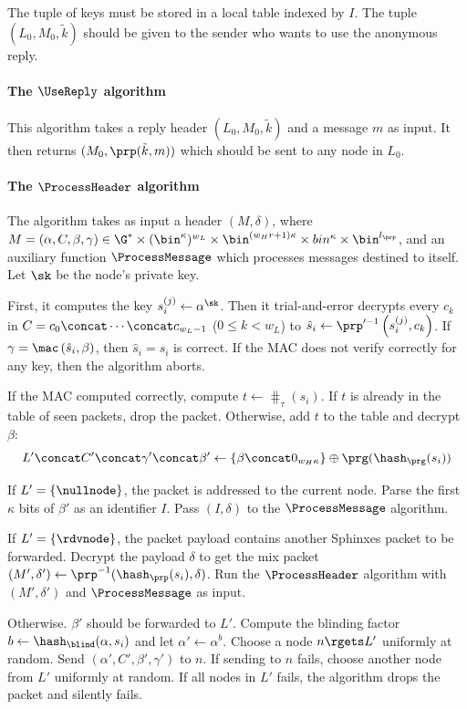 The tuple of keys must be stored in a local table indexed by \(I\).
The tuple \((L_0, M_0, \tilde k)\) should be given to the sender who wants to 
use the anonymous reply.

\paragraph*{The \(\UseReply\) algorithm}

This algorithm takes a reply header \((L_0, M_0, \tilde k)\) and a message 
\(m\) as input.
It then returns \((M_0, \prp(\tilde k, m))\) which should be sent to any node 
in \(L_0\).

\paragraph*{The \(\ProcessHeader\) algorithm}

The algorithm takes as input a header \((M, \delta)\), where \(M = (\alpha, C, 
  \beta, \gamma)\in \G^*\times (\bin^\kappa)^{w_L} \times \bin^{(w_H 
    r+1)\kappa}\times bin^\kappa\times \bin^{l_\prp}\), and an auxiliary 
function \(\ProcessMessage\) which processes messages destined to itself.
Let \(\sk\) be the node's private key.

First, it computes the key \(s_i^{(j)}\gets \alpha^\sk\).
Then it trial-and-error decrypts every \(c_k\) in \(C = c_0\concat 
  \dotsb\concat c_{w_L-1}\) (\(0\leq k< w_L\)) to \(\hat s_i\gets \prp^{\prime 
    -1}\left(s_i^{(j)}, c_k\right)\).
If \(\gamma = \mac\left(\hat s_i, \beta\right)\), then \(\hat s_i = s_i\) is 
correct.
If the \ac{MAC} does not verify correctly for any key, then the algorithm 
aborts.

If the \ac{MAC} computed correctly, compute \(t\gets \hash_\tau(s_i)\).
If \(t\) is already in the table of seen packets, drop the packet.
Otherwise, add \(t\) to the table and decrypt \(\beta\):
\begin{equation*}
  L'\concat C'\concat \gamma'\concat \beta'\gets \{\beta\concat 0_{w_H 
    \kappa}\}
  \oplus \prg(\hash_\prg(s_i))
\end{equation*}

If \(L' = \{\nullnode\}\), the packet is addressed to the current node.
Parse the first \(\kappa\) bits of \(\beta'\) as an identifier \(I\).
Pass \((I, \delta)\) to the \(\ProcessMessage\) algorithm.

If \(L' = \{\rdvnode\}\), the packet payload contains another Sphinxes packet 
to be forwarded.
Decrypt the payload \(\delta\) to get the mix packet \((M', \delta')\gets 
  \prp^{-1}(\hash_\prp(s_i), \delta)\).
Run the \(\ProcessHeader\) algorithm with \((M', \delta')\) and 
\(\ProcessMessage\) as input.

Otherwise. \(\beta'\) should be forwarded to \(L'\).
Compute the blinding factor \(b\gets \hash_\blind(\alpha, s_i)\) and let 
\(\alpha'\gets \alpha^b\).
Choose a node \(n\rgets L'\) uniformly at random.
Send \((\alpha', C', \beta', \gamma')\) to \(n\).
If sending to \(n\) fails, choose another node from \(L'\) uniformly at random.
If all nodes in \(L'\) fails, the algorithm drops the packet and silently 
fails.
